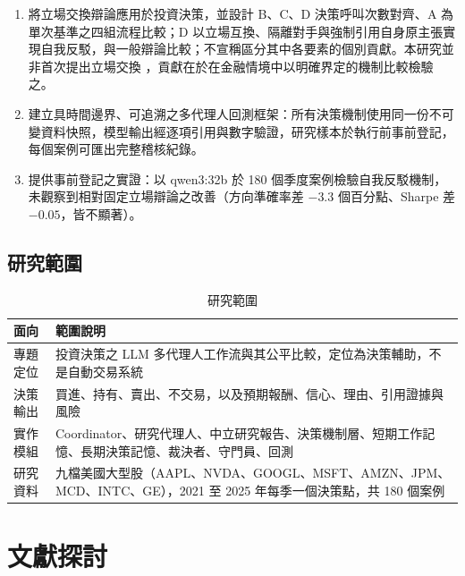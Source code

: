 \documentclass[12pt,a4paper]{article}
\newcommand{\grp}[1]{\textsf{#1}}
\begin{document}
\begin{CJK}{UTF8}{bkai}
\begin{enumerate}[label=\arabic*.]
  \item 將立場交換辯論應用於投資決策，並設計 \grp{B}、\grp{C}、\grp{D} 決策呼叫次數對齊、\grp{A} 為單次基準之四組流程比較；\grp{D} 以立場互換、隔離對手與強制引用自身原主張實現自我反駁，與一般辯論比較；不宣稱區分其中各要素的個別貢獻。本研究並非首次提出立場交換 \citep{liu2025roleswitch,chowdhury2026proclaim}，貢獻在於在金融情境中以明確界定的機制比較檢驗之。
  \item 建立具時間邊界、可追溯之多代理人回測框架：所有決策機制使用同一份不可變資料快照，模型輸出經逐項引用與數字驗證，研究樣本於執行前事前登記，每個案例可匯出完整稽核紀錄。
  \item 提供事前登記之實證：以 qwen3:32b 於 180 個季度案例檢驗自我反駁機制，未觀察到相對固定立場辯論之改善（方向準確率差 $-3.3$ 個百分點、Sharpe 差 $-0.05$，皆不顯著）。
\end{enumerate}

\subsection{研究範圍}

\begin{table}[H]
\centering\small
\caption{研究範圍}
\label{tab:scope}
\begin{tabularx}{\textwidth}{@{}l Y@{}}
\toprule
面向 & 範圍說明 \\
\midrule
專題定位 & 投資決策之 LLM 多代理人工作流與其公平比較，定位為決策輔助，不是自動交易系統 \\
決策輸出 & 買進、持有、賣出、不交易，以及預期報酬、信心、理由、引用證據與風險 \\
實作模組 & Coordinator、研究代理人、中立研究報告、決策機制層、短期工作記憶、長期決策記憶、裁決者、守門員、回測 \\
研究資料 & 九檔美國大型股（AAPL、NVDA、GOOGL、MSFT、AMZN、JPM、MCD、INTC、GE），2021 至 2025 年每季一個決策點，共 180 個案例 \\
\bottomrule
\end{tabularx}
\end{table}

\section{文獻探討}
\label{sec:related}


\end{CJK}
\end{document}
